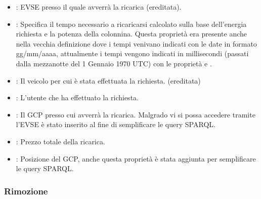 \begin{itemize}
	\item {}: EVSE presso il quale avverrà la ricarica (ereditata).
	\item {}: Specifica il tempo necessario a ricaricarsi calcolato sulla base dell'energia richiesta e la potenza della colonnina. Questa proprietà era presente anche nella vecchia definizione dove i tempi venivano indicati con le date in formato gg/mm/aaaa, attualmente i tempi vengono indicati in millisecondi (passati dalla mezzanotte del 1 Gennaio 1970 UTC) con le proprietà  e .
	\item {}: Il veicolo per cui è stata effettuata la richiesta. (ereditata)
	\item {}: L'utente che ha effettuato la richiesta.
	\item {}: Il GCP presso cui avverrà la ricarica. Malgrado vi si possa accedere tramite l'EVSE è stato inserito al fine di semplificare le query SPARQL.
	\item {}: Prezzo totale della ricarica.
	\item {}: Posizione del GCP, anche questa proprietà è stata aggiunta per semplificare le query SPARQL.
\end{itemize}


\subsubsection{Rimozione }\label{subsubsec:chargeresponse}